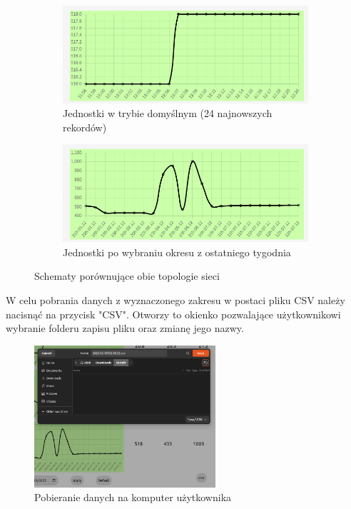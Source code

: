 \begin{figure}[H]
    \centering
    \begin{subfigure}{0.7\textwidth}
        \centering
        \includegraphics[width=\linewidth]{zdj/app/time-unit1.png}
        \caption{Jednostki w trybie domyślnym (24 najnowszych rekordów)}
    \end{subfigure}
    \begin{subfigure}{0.7\textwidth}
        \centering
        \includegraphics[width=\linewidth]{zdj/app/time-unit2.png}
        \caption{Jednostki po wybraniu okresu z ostatniego tygodnia}
    \end{subfigure}
       
    \caption{Schematy porównujące obie topologie sieci}
\end{figure}
W celu pobrania danych z wyznaczonego zakresu w postaci pliku CSV należy nacisnąć na przycisk "CSV". Otworzy to okienko pozwalające użytkownikowi wybranie folderu
zapisu pliku oraz zmianę jego nazwy. 

\begin{figure}[H]
    \includegraphics[width=0.6\textwidth]{zdj/app/download-csv.png}
    \caption{Pobieranie danych na komputer użytkownika}
\end{figure}

